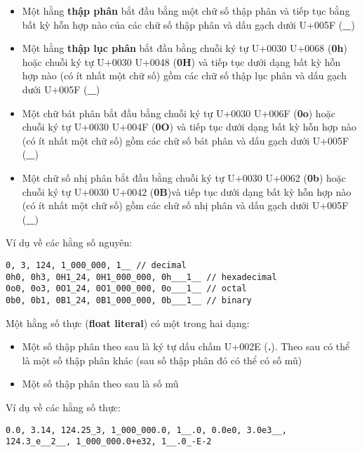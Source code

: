     \begin{itemize}
        \item{Một hằng \textbf{thập phân} bắt đầu bằng một chữ số thập phân và tiếp tục bằng bất kỳ hỗn hợp nào của các chữ số thập phân và dấu gạch dưới U+005F (\textbf{\_})}
        \item{Một hằng \textbf{thập lục phân} bắt đầu bằng chuỗi ký tự U+0030 U+0068 (\textbf{0h}) hoặc chuỗi ký tự U+0030 U+0048 (\textbf{0H}) và tiếp tục dưới dạng bất kỳ hỗn hợp nào (có ít nhất một chữ số) gồm các chữ số thập lục phân và dấu gạch dưới U+005F (\textbf{\_})}
        \item{Một chữ bát phân bắt đầu bằng chuỗi ký tự U+0030 U+006F (\textbf{0o}) hoặc chuỗi ký tự U+0030 U+004F (\textbf{0O}) và tiếp tục dưới dạng bất kỳ hỗn hợp nào (có ít nhất một chữ số) gồm các chữ số bát phân và dấu gạch dưới U+005F (\textbf{\_})}
        \item{Một chữ số nhị phân bắt đầu bằng chuỗi ký tự U+0030 U+0062 (\textbf{0b}) hoặc chuỗi ký tự U+0030 U+0042 (\textbf{0B})và tiếp tục dưới dạng bất kỳ hỗn hợp nào (có ít nhất một chữ số) gồm các chữ số nhị phân và dấu gạch dưới U+005F (\textbf{\_})}
    \end{itemize}

    \regexintegerliteral

\noindent Ví dụ về các hằng số nguyên:
\begin{lstlisting}[]
0, 3, 124, 1_000_000, 1__ // decimal
0h0, 0h3, 0H1_24, 0H1_000_000, 0h___1__ // hexadecimal
0o0, 0o3, 0O1_24, 0O1_000_000, 0o___1__ // octal
0b0, 0b1, 0B1_24, 0B1_000_000, 0b___1__ // binary
\end{lstlisting}

    Một hằng số thực (\textbf{float literal}) có một trong hai dạng:
    \begin{itemize}
        \item{Một số thập phân theo sau là ký tự dấu chấm U+002E (\textbf{.}). Theo sau có thể là một số thập phân khác (sau số thập phân đó có thể có số mũ)}
        \item{Một số thập phân theo sau là số mũ}
    \end{itemize}

    \regexfloatliteral
    
\noindent Ví dụ về các hằng số thực:
\begin{lstlisting}[]
0.0, 3.14, 124.25_3, 1_000_000.0, 1__.0, 0.0e0, 3.0e3__, 
124.3_e__2__, 1_000_000.0+e32, 1__.0_-E-2
\end{lstlisting}

